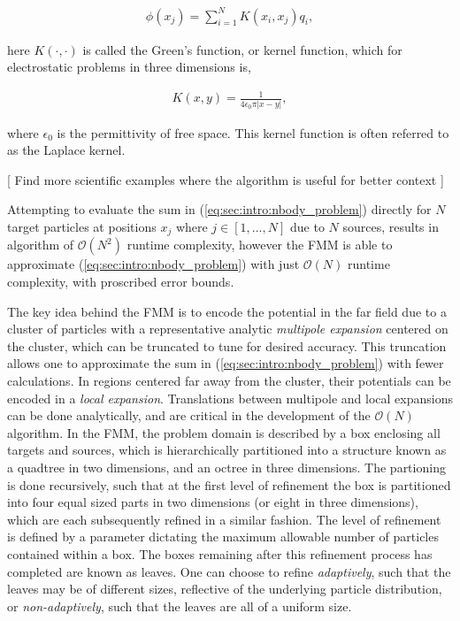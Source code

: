 \documentclass{IEEEcsmag}
\begin{document}
\begin{eqnarray}
	\phi(x_j) = \sum_{i=1}^{N} K(x_i, x_j) q_i,
\label{eq:sec:intro:nbody_problem}
\end{eqnarray}

here $K(\cdot, \cdot)$ is called the Green's function, or kernel function, which for electrostatic problems in three dimensions is,

\begin{eqnarray}
	K(x, y) = \frac{1}{4\epsilon_0\pi|x-y|},
\label{eq:sec:intro:laplace_kernel}
\end{eqnarray}

where $\epsilon_0$ is the permittivity of free space. This kernel function is often referred to as the Laplace kernel.

[ Find more scientific examples where the algorithm is useful for better context ]

Attempting to evaluate the sum in (\ref{eq:sec:intro:nbody_problem}) directly for $N$ target particles at positions $x_j$ where $j \in [1,...,N]$ due to $N$ sources, results in algorithm of $\mathcal{O}(N^2)$ runtime complexity, however the FMM is able to approximate (\ref{eq:sec:intro:nbody_problem}) with just $\mathcal{O}(N)$ runtime complexity, with proscribed error bounds.

The key idea behind the FMM is to encode the potential in the far field due to a cluster of particles with a representative analytic \textit{multipole expansion} centered on the cluster, which can be truncated to tune for desired accuracy. This truncation allows one to approximate the sum in (\ref{eq:sec:intro:nbody_problem}) with fewer calculations. In regions centered far away from the cluster, their potentials can be encoded in a \textit{local expansion}. Translations between multipole and local expansions can be done analytically, and are critical in the development of the $\mathcal{O}(N)$ algorithm. In the FMM, the problem domain is described by a box enclosing all targets and sources, which is hierarchically partitioned into a structure known as a quadtree in two dimensions, and an octree in three dimensions. The partioning is done recursively, such that at the first level of refinement the box is partitioned into four equal sized parts in two dimensions (or eight in three dimensions), which are each subsequently refined in a similar fashion. The level of refinement is defined by a parameter dictating the maximum allowable number of particles contained within a box. The boxes remaining after this refinement process has completed are known as leaves. One can choose to refine \textit{adaptively}, such that the leaves may be of different sizes, reflective of the underlying particle distribution, or \textit{non-adaptively}, such that the leaves are all of a uniform size.
\end{document}
